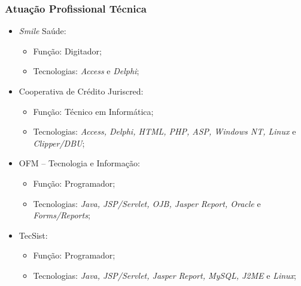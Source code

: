 \documentclass[aspectratio=169]{beamer}
\begin{document}
\begin{frame}
	\frametitle{Atuação Profissional Técnica}

	\begin{itemize}
		\item \textit{Smile} Saúde:
		\begin{itemize}
			\item Função: Digitador;
			\item Tecnologias: \textit{Access} e \textit{Delphi};
		\end{itemize}
		
		\item Cooperativa de Crédito Juriscred:
		\begin{itemize}
			\item Função: Técnico em Informática;
			\item Tecnologias: \textit{Access, Delphi, HTML, PHP, ASP, Windows NT, Linux} e \textit{Clipper/DBU};
		\end{itemize}
		
		\item OFM -- Tecnologia e Informação:
		\begin{itemize}
			\item Função: Programador;
			\item Tecnologias: \textit{Java, JSP/Servlet, OJB, Jasper Report, Oracle} e \textit{Forms/Reports};
		\end{itemize}
		
		\item TecSist:
		\begin{itemize}
			\item Função: Programador;
			\item Tecnologias: \textit{Java, JSP/Servlet, Jasper Report, MySQL, J2ME} e \textit{Linux};
		\end{itemize}
	\end{itemize}
\end{frame}
\end{document}
